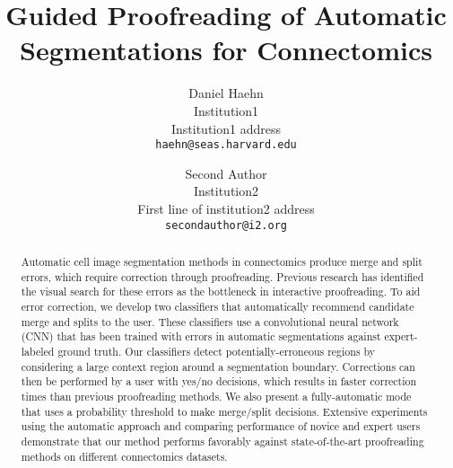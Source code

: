 \documentclass[10pt,twocolumn,letterpaper]{article}
\begin{document}
\title{Guided Proofreading of Automatic Segmentations for Connectomics}

\author{Daniel Haehn\\
Institution1\\
Institution1 address\\
{\tt\small haehn@seas.harvard.edu}
\and
Second Author\\
Institution2\\
First line of institution2 address\\
{\tt\small secondauthor@i2.org}
}

\maketitle

\begin{abstract}
%
Automatic cell image segmentation methods in connectomics produce merge and
split errors, which require correction through proofreading. Previous research
has identified the visual search for these errors as the bottleneck in
interactive proofreading. To aid error correction, we develop two classifiers
that automatically recommend candidate merge and splits to the user. These
classifiers use a convolutional neural network (CNN) that has been trained with
errors in automatic segmentations against expert-labeled ground truth. Our
classifiers detect potentially-erroneous regions by considering a large context
region around a segmentation boundary. Corrections can then be performed by a
user with yes/no decisions,  which results in faster correction times than previous
proofreading methods. We also present a fully-automatic mode that uses a
probability threshold to make merge/split decisions. Extensive experiments using
the automatic approach and comparing performance of novice and expert users
demonstrate that our method performs favorably against state-of-the-art
proofreading methods on different connectomics datasets.
%
\end{abstract}














{\small


}
\end{document}
